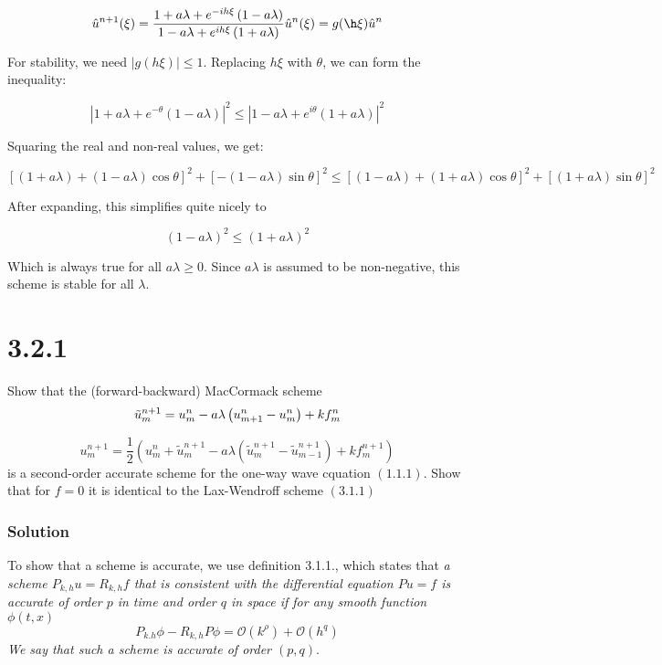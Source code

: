 \documentclass[12pt]{article}
\begin{document}
$$\hat{u}^{n+1}(\xi) = \frac{1 + {a\lambda} + e^{-ih\xi}\left(1 - a\lambda\right)}{1 - {a\lambda} + e^{ih\xi}\left(1+ {a\lambda}\right)}\hat{u}^n(\xi) = g(\h\xi)\hat{u}^n$$

\noindent For stability, we need $|g(h\xi)|\leq1$. Replacing $h\xi$ with $\theta$, we can form  the inequality:

$$\left|1 + {a\lambda} + e^{-\theta}\left(1 - a\lambda\right)\right|^2 \leq \left|1 - {a\lambda} + e^{i\theta}\left(1+ {a\lambda}\right)\right|^2$$

\noindent Squaring the real and non-real values, we get:

$$ [(1+a\lambda)+(1-a\lambda)\cos\theta]^2 + [-(1-a\lambda)\sin\theta]^2 \leq [(1-a\lambda)+(1+a\lambda)\cos\theta]^2 + [(1+a\lambda)\sin\theta]^2$$

\noindent After expanding, this simplifies quite nicely to

$$ (1-a\lambda)^2 \leq (1+a\lambda)^2 $$

\noindent Which is always true for all $a\lambda \geq 0$. Since $a\lambda$ is assumed to be non-negative, this scheme is stable for all $\lambda$.

\section*{3.2.1}
Show that the (forward-backward) MacCormack scheme
$$
{\tilde{u}_{m}^{n+1}=u_{m}^{n}-a \lambda\left(u_{m+1}^{n}-u_{m}^{n}\right)+k f_{m}^{n}} \\$$

$$
{u_{m}^{n+1}=\frac{1}{2}\left(u_{m}^{n}+\tilde{u}_{m}^{n+1}-a \lambda\left(\tilde{u}_{m}^{n+1}-\tilde{u}_{m-1}^{n+1}\right)+k f_{m}^{n+1}\right)}
$$
is a second-order accurate scheme for the one-way wave cquation $(1.1 .1) .$ Show that for $f=0$ it is identical to the Lax-Wendroff scheme $(3.1 .1)$

\subsubsection*{Solution}

To show that a scheme is accurate, we use definition 3.1.1., which states that \textit{a scheme $P_{k, h} u=R_{k, h} f$ that is consistent with the differential equation $P u=f$ is accurate of order $p$ in time and order $q$ in space if for any smooth function $\phi(t, x)$
$$
P_{k . h} \phi-R_{k, h} P \phi=\mathcal{O}\left(k^{\rho}\right)+\mathcal{O}\left(h^{q}\right)
$$
We say that such a scheme is accurate of order $(p, q)$}. 
\end{document}
